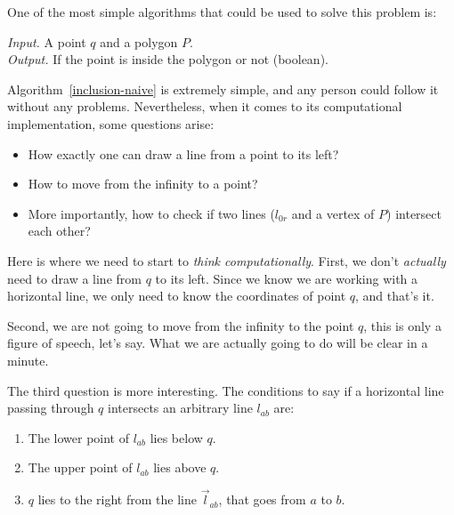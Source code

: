 \documentclass[twoside,12pt, a4paper]{memoir}
\begin{document}
One of the most simple algorithms that could be used to solve this problem is:

\begin{algorithm}
\caption{$PointInclusion(q, P)$}
\textit{Input.} A point $q$ and a polygon $P$. \\
\textit{Output.} If the point is inside the polygon or not (boolean).
\begin{algorithmic}[1]
    \Else{}
    \EndIf{}
\end{algorithmic}\label{inclusion-naive}
\end{algorithm}

Algorithm~\ref{inclusion-naive} is extremely simple, and any person could follow it without any problems. Nevertheless, when it comes to its computational implementation, some questions arise:

\begin{itemize}
  \item How exactly one can draw a line from a point to its left?
  \item How to move from the infinity to a point?
  \item More importantly, how to check if two lines ($l_{0r}$ and a vertex of $P$) intersect each other?
\end{itemize}

Here is where we need to start to \textit{think computationally}. First, we don't \textit{actually} need to draw a line from $q$ to its left. Since we know we are working with a horizontal line, we only need to know the coordinates of point $q$, and that's it.

Second, we are not going to move from the infinity to the point $q$, this is only a figure of speech, let's say. What we are actually going to do will be clear in a minute.

The third question is more interesting. The conditions to say if a horizontal line passing through $q$ intersects an arbitrary line $l_{ab}$ are:

\begin{enumerate}
  \item The lower point of $l_{ab}$ lies below $q$.
  \item The upper point of $l_{ab}$ lies above $q$.
  \item $q$ lies to the right from the line $\overrightarrow{l}_{ab}$, that goes from $a$ to $b$.
\end{enumerate}
\end{document}
